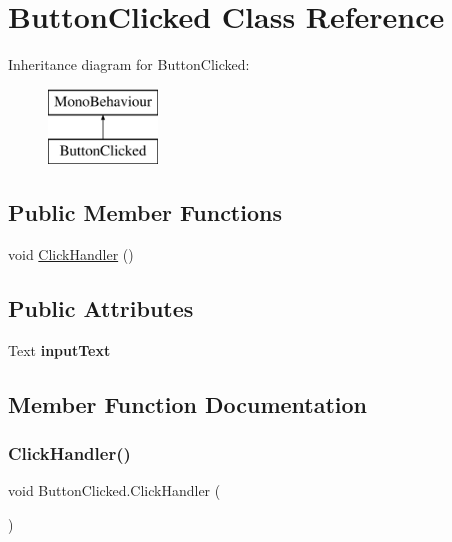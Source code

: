 \hypertarget{class_button_clicked}{}\section{Button\+Clicked Class Reference}
\label{class_button_clicked}
Inheritance diagram for Button\+Clicked\+:\begin{figure}[H]
\begin{center}
\leavevmode
\includegraphics[height=2.000000cm]{class_button_clicked}
\end{center}
\end{figure}
\subsection*{Public Member Functions}
\begin{DoxyCompactItemize}
\item 
void \mbox{\hyperlink{class_button_clicked_a8baf876afa682bea0f244c16a4e36d56}{Click\+Handler}} ()
\end{DoxyCompactItemize}
\subsection*{Public Attributes}
\begin{DoxyCompactItemize}
\item 
\mbox{\label{class_button_clicked_a0400dacb5284f5f4d7c63868762f2236}} 
Text {\bfseries input\+Text}
\end{DoxyCompactItemize}


\subsection{Member Function Documentation}
\mbox{\label{class_button_clicked_a8baf876afa682bea0f244c16a4e36d56}} 
\subsubsection{\texorpdfstring{ClickHandler()}{ClickHandler()}}
{\footnotesize\ttfamily void Button\+Clicked.\+Click\+Handler (\begin{DoxyParamCaption}{ }\end{DoxyParamCaption})}

